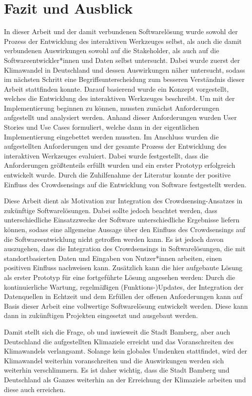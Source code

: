 \chapter{Fazit und Ausblick}

In dieser Arbeit und der damit verbundenen Softwarelösung wurde sowohl der Prozess der Entwicklung des interaktiven Werkzeuges selbst, als auch die damit verbundenen Auswirkungen sowohl auf die Stakeholder, als auch auf die Softwareentwickler*innen und Daten selbst untersucht. Dabei wurde zuerst der Klimawandel in Deutschland und dessen Auswirkungen näher untersucht, sodass im nächsten Schritt eine Begriffsunterscheidung zum besseren Verständnis dieser Arbeit stattfinden konnte. Darauf basierend wurde ein Konzept vorgestellt, welches die Entwicklung des interaktiven Werkzeuges beschreibt. Um mit der Implementierung beginnen zu können, mussten zunächst Anforderungen aufgestellt und analysiert werden. Anhand dieser Anforderungen wurden User Stories und Use Cases formuliert, welche dann in der eigentlichen Implementierung eingebettet werden mussten. Im Anschluss wurden die aufgestellten Anforderungen und der gesamte Prozess der Entwicklung des interaktiven Werkzeuges evaluiert. Dabei wurde festgestellt, dass die Anforderungen größtenteils erfüllt wurden und ein erster Prototyp erfolgreich entwickelt wurde. Durch die Zuhilfenahme der Literatur konnte der positive Einfluss des Crowdsensings auf die Entwicklung von Software festgestellt werden.

Diese Arbeit dient als Motivation zur Integration des Crowdsensing-Ansatzes in zukünftige Softwarelösungen. Dabei sollte jedoch beachtet werden, dass unterschiedliche Einsatzzwecke der Software unterschiedliche Ergebnisse liefern können, sodass eine allgemeine Aussage über den Einfluss des Crowdsensings auf die Softwareentwicklung nicht getroffen werden kann. Es ist jedoch davon auszugehen, dass die Integration des Crowdsensings in Softwarelösungen, die mit standortbasierten Daten und Eingaben von Nutzer*innen arbeiten, einen positiven Einfluss nachweisen kann. Zusätzlich kann die hier aufgebaute Lösung als erster Prototyp für eine fortgeführte Lösung angesehen werden: Durch die kontinuierliche Wartung, regelmäßigen (Funktions-)Updates, der Integration der Datenquellen in Echtzeit und dem Erfüllen der offenen Anforderungen kann auf Basis dieser Arbeit eine vollwertige Softwarelösung entwickelt werden. Diese kann dann in zukünftigen Projekten eingesetzt und ausgebaut werden.

Damit stellt sich die Frage, ob und inwieweit die Stadt Bamberg, aber auch Deutschland die aufgestellten Klimaziele erreicht und das Voranschreiten des Klimawandels verlangsamt. Solange kein globales Umdenken stattfindet, wird der Klimawandel weiterhin voranschreiten und die Auswirkungen werden sich weiterhin verschlimmern. Es ist daher wichtig, dass die Stadt Bamberg und Deutschland als Ganzes weiterhin an der Erreichung der Klimaziele arbeiten und diese auch erreichen.